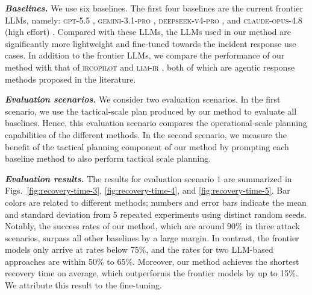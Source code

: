 \documentclass[runningheads,10pt]{llncs}
\begin{document}
\noindent\textit{\textbf{Baselines.}} We use six baselines. The first four baselines are the current frontier LLMs, namely: \textsc{gpt-5.5} \cite{gpt5-5}, \textsc{gemini-3.1-pro} \cite{gemini3-1}, \textsc{deepseek-v4-pro} \cite{ds-v4}, and \textsc{claude-opus-4.8} (high effort) \cite{opus4-8}. Compared with these LLMs, the LLMs used in our method are significantly more lightweight and fine-tuned towards the incident response use cases. In addition to the frontier LLMs, we compare the performance of our method with that of \textsc{ircopilot} \cite{guo25ircopilot} and \textsc{llm-ir} \cite{kim26ndss}, both of which are agentic response methods proposed in the literature.

\noindent\textit{\textbf{Evaluation scenarios.}} We consider two evaluation scenarios. In the first scenario, we use the tactical-scale plan produced by our method to evaluate all baselines. Hence, this evaluation scenario compares the operational-scale planning capabilities of the different methods. In the second scenario, we measure the benefit of the tactical planning component of our method by prompting each baseline method to also perform tactical scale planning.

\noindent\textit{\textbf{Evaluation results.}} The results for evaluation scenario $1$ are summarized in Figs.~\ref{fig:recovery-time-3}, \ref{fig:recovery-time-4}, and \ref{fig:recovery-time-5}. Bar colors are related to different methods; numbers and error bars indicate the mean and standard deviation from 5 repeated experiments using distinct random seeds. Notably, the success rates of our method, which are around 90\% in three attack scenarios, surpass all other baselines by a large margin. In contrast, the frontier models only arrive at rates below 75\%, and the rates for two LLM-based approaches are within 50\% to 65\%. Moreover, our method achieves the shortest recovery time on average, which outperforms the frontier models by up to 15\%. We attribute this result to the fine-tuning.
\end{document}
